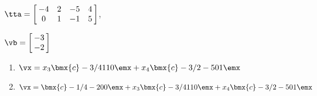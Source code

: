 {$\tta = \left[\hskip -3pt \begin{array}{cccc} -4&2&-5&4\\  0&1&-1&5
\end{array}\hskip -3pt \right] $, 

$\vb=\left[\hskip -3pt \begin{array}{c} -3\\  -2\end {array}\hskip -3pt \right] $}
{\begin{enumerate}
\item	 $\vx=x_3\bmx{c}-3/4\\1\\1\\0\emx+x_4\bmx{c}-3/2\\-5\\0\\1\emx$

\item	$\vx=\bmx{c}-1/4\\-2\\0\\0\emx + x_3\bmx{c}-3/4\\1\\1\\0\emx+x_4\bmx{c}-3/2\\-5\\0\\1\emx$
\end{enumerate}}

 